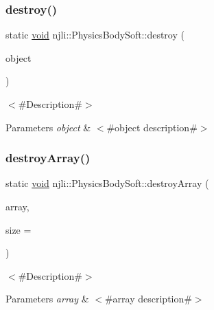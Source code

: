 \subsubsection{\texorpdfstring{destroy()}{destroy()}}
{\footnotesize\ttfamily static \mbox{\hyperlink{_thread_8h_af1e856da2e658414cb2456cb6f7ebc66}{void}} njli\+::\+Physics\+Body\+Soft\+::destroy (\begin{DoxyParamCaption}\item[{\mbox{\hyperlink{classnjli_1_1_physics_body_soft}{Physics\+Body\+Soft}} $\ast$}]{object }\end{DoxyParamCaption})\hspace{0.3cm}{\ttfamily [static]}}

$<$\#\+Description\#$>$


\begin{DoxyParams}{Parameters}
{\em object} & $<$\#object description\#$>$ \\
\hline
\end{DoxyParams}
\mbox{\label{classnjli_1_1_physics_body_soft_a00f6b3d236273705d53e306ad7da80ed}} 
\subsubsection{\texorpdfstring{destroy\+Array()}{destroyArray()}}
{\footnotesize\ttfamily static \mbox{\hyperlink{_thread_8h_af1e856da2e658414cb2456cb6f7ebc66}{void}} njli\+::\+Physics\+Body\+Soft\+::destroy\+Array (\begin{DoxyParamCaption}\item[{\mbox{\hyperlink{classnjli_1_1_physics_body_soft}{Physics\+Body\+Soft}} $\ast$$\ast$}]{array,  }\item[{const \mbox{\hyperlink{_util_8h_a10e94b422ef0c20dcdec20d31a1f5049}{u32}}}]{size = {} }\end{DoxyParamCaption})\hspace{0.3cm}{\ttfamily [static]}}

$<$\#\+Description\#$>$


\begin{DoxyParams}{Parameters}
{\em array} & $<$\#array description\#$>$ \\
\hline
\end{DoxyParams}
\mbox{\label{classnjli_1_1_physics_body_soft_abda1dce34eaaf0e2524d2f6afde1c502}} 
